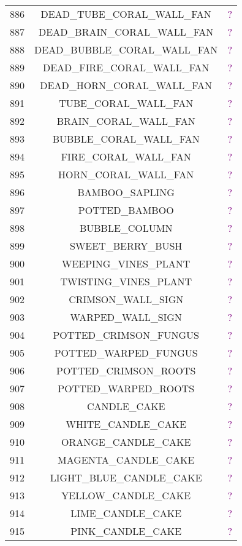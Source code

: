 \documentclass[11pt]{article}
\newcommand\myworries[1]{\textcolor{purple}{#1}}
\begin{document}
\begin{longtable}{ |c|c|c| }
	886 & DEAD\_TUBE\_CORAL\_WALL\_FAN & \myworries{?} \\
	887 & DEAD\_BRAIN\_CORAL\_WALL\_FAN & \myworries{?} \\
	888 & DEAD\_BUBBLE\_CORAL\_WALL\_FAN & \myworries{?} \\
	889 & DEAD\_FIRE\_CORAL\_WALL\_FAN & \myworries{?} \\
	890 & DEAD\_HORN\_CORAL\_WALL\_FAN & \myworries{?} \\
	891 & TUBE\_CORAL\_WALL\_FAN & \myworries{?} \\
	892 & BRAIN\_CORAL\_WALL\_FAN & \myworries{?} \\
	893 & BUBBLE\_CORAL\_WALL\_FAN & \myworries{?} \\
	894 & FIRE\_CORAL\_WALL\_FAN & \myworries{?} \\
	895 & HORN\_CORAL\_WALL\_FAN & \myworries{?} \\
	896 & BAMBOO\_SAPLING & \myworries{?} \\
	897 & POTTED\_BAMBOO & \myworries{?} \\
	898 & BUBBLE\_COLUMN & \myworries{?} \\
	899 & SWEET\_BERRY\_BUSH & \myworries{?} \\
	900 & WEEPING\_VINES\_PLANT & \myworries{?} \\
	901 & TWISTING\_VINES\_PLANT & \myworries{?} \\
	902 & CRIMSON\_WALL\_SIGN & \myworries{?} \\
	903 & WARPED\_WALL\_SIGN & \myworries{?} \\
	904 & POTTED\_CRIMSON\_FUNGUS & \myworries{?} \\
	905 & POTTED\_WARPED\_FUNGUS & \myworries{?} \\
	906 & POTTED\_CRIMSON\_ROOTS & \myworries{?} \\
	907 & POTTED\_WARPED\_ROOTS & \myworries{?} \\
	908 & CANDLE\_CAKE & \myworries{?} \\
	909 & WHITE\_CANDLE\_CAKE & \myworries{?} \\
	910 & ORANGE\_CANDLE\_CAKE & \myworries{?} \\
	911 & MAGENTA\_CANDLE\_CAKE & \myworries{?} \\
	912 & LIGHT\_BLUE\_CANDLE\_CAKE & \myworries{?} \\
	913 & YELLOW\_CANDLE\_CAKE & \myworries{?} \\
	914 & LIME\_CANDLE\_CAKE & \myworries{?} \\
	915 & PINK\_CANDLE\_CAKE & \myworries{?} \\

\end{longtable}
\end{document}
